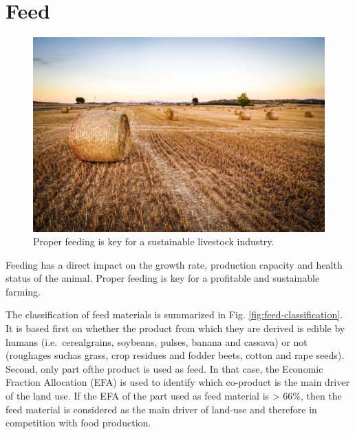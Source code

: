 \documentclass[]{book}
\begin{document}
\hypertarget{feed}{%
\chapter{Feed}\label{feed}}

\begin{figure}

{\centering \includegraphics[width=1\linewidth]{figures/hay-feed} 

}

\caption{Proper feeding is key for a sustainable livestock industry.}\label{fig:hay-feed}
\end{figure}

Feeding has a direct impact on the growth rate, production capacity and health status of the animal. Proper feeding is key for a profitable and sustainable farming.

The classification of feed materials is summarized in Fig. \ref{fig:feed-classification}. It is based first on whether the product from which they are derived is edible by humans (i.e.~cerealgrains, soybeans, pulses, banana and cassava) or not (roughages suchas grass, crop residues and fodder beets, cotton and rape seeds). Second, only part ofthe product is used as feed. In that case, the Economic Fraction Allocation (EFA) is used to identify which co-product is the main driver of the land use. If the EFA of the part used as feed material is \textgreater{} 66\%, then the feed material is considered as the main driver of land-use and therefore in competition with food production.
\end{document}
